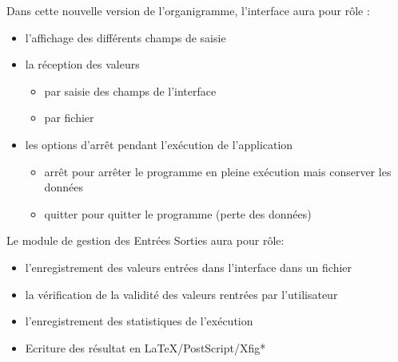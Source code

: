 \documentclass[a4paper,11pt]{article}
\begin{document}
		Dans cette nouvelle version de l’organigramme, l’interface aura pour rôle :
		\begin{itemize}
		\item l’affichage des différents champs de saisie
		\item la réception des valeurs
			\begin{itemize}
				\item par saisie des champs de l’interface
				\item par fichier
			\end{itemize}
			
		\item les options d’arrêt pendant l'exécution de l’application
			\begin{itemize}
				\item arrêt pour arrêter le programme en pleine exécution mais conserver les données
				\item quitter pour quitter le programme (perte des données)\\
			\end{itemize}
		\end{itemize}
		Le module de gestion des Entrées Sorties aura pour rôle:
		\begin{itemize}
				\item l’enregistrement des valeurs entrées dans l’interface dans un fichier
				\item la vérification de la validité des valeurs rentrées par l’utilisateur
				\item l’enregistrement des statistiques de l'exécution
				\item Ecriture des résultat en LaTeX/PostScript/Xfig*\\
		\end{itemize}
\end{document}
